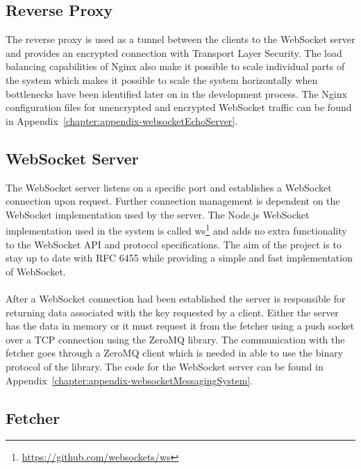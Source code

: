 \subsection{Reverse Proxy}

The reverse proxy is used as a tunnel between the clients to the WebSocket server and provides an encrypted connection with Transport Layer Security. The load balancing capabilities of Nginx also make it possible to scale individual parts of the system which makes it possible to scale the system horizontally when bottlenecks have been identified later on in the development process. The Nginx configuration files for unencrypted and encrypted WebSocket traffic can be found in Appendix~\ref{chapter:appendix-websocketEchoServer}.


\subsection{WebSocket Server}

The WebSocket server listens on a specific port and establishes a WebSocket connection upon request. Further connection management is dependent on the WebSocket implementation used by the server. The Node.js WebSocket implementation used in the system is called ws\footnote{\url{https://github.com/websockets/ws}} and adds no extra functionality to the WebSocket API and protocol specifications. The aim of the project is to stay up to date with RFC 6455 while providing a simple and fast implementation of WebSocket.
\\ \\
After a WebSocket connection had been established the server is responsible for returning data associated with the key requested by a client. Either the server has the data in memory or it must request it from the fetcher using a push socket over a TCP connection using the ZeroMQ library. The communication with the fetcher goes through a ZeroMQ client which is needed in able to use the binary protocol of the library. The code for the WebSocket server can be found in Appendix~\ref{chapter:appendix-websocketMessagingSystem}.

\subsection{Fetcher}

